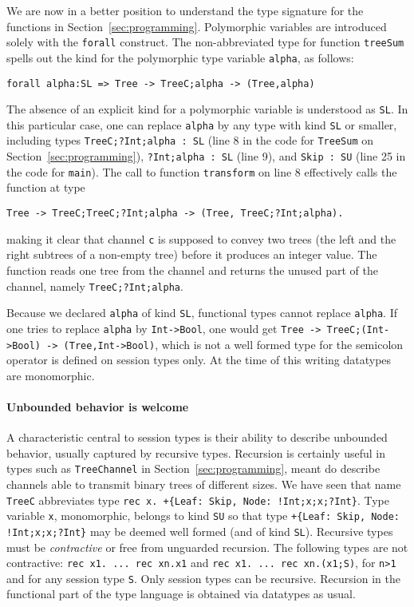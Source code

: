 We are now in a better position to understand the type signature for
the functions in Section~\ref{sec:programming}.  Polymorphic variables
are introduced solely with the \lstinline|forall| construct. The
non-abbreviated type for function \lstinline|treeSum| spells out the
kind for the polymorphic type variable \lstinline|alpha|, as follows:
%
\begin{lstlisting}
forall alpha:SL => Tree -> TreeC;alpha -> (Tree,alpha)
\end{lstlisting}
%
The absence of an explicit kind for a polymorphic variable is
understood as \lstinline|SL|. In this particular case, one can replace
\lstinline|alpha| by any type with kind \lstinline|SL| or smaller,
including types \lstinline|TreeC;?Int;alpha : SL| (line 8 in the code
for \lstinline|TreeSum| on Section~\ref{sec:programming}),
\lstinline|?Int;alpha : SL| (line 9), and \lstinline|Skip : SU| (line
25 in the code for \lstinline|main|).
%
The call to function \lstinline|transform| on line
8 effectively calls the function at type
%
\begin{lstlisting}
Tree -> TreeC;TreeC;?Int;alpha -> (Tree, TreeC;?Int;alpha).
\end{lstlisting}
%
making it clear that channel \lstinline|c| is supposed to convey two
trees (the left and the right subtrees of a non-empty tree) before it
produces an integer value. The function reads one tree from the
channel and returns the unused part of the channel, namely
\lstinline|TreeC;?Int;alpha|.

Because we declared \lstinline|alpha| of kind \lstinline|SL|,
functional types cannot replace \lstinline|alpha|.  If one tries to
replace \lstinline|alpha| by \lstinline|Int->Bool|, one would get
%
\lstinline|Tree -> TreeC;(Int->Bool) -> (Tree,Int->Bool)|, which is
not a well formed type for the semicolon operator is defined on
session types only.
%
At the time of this writing datatypes are monomorphic.

\paragraph{Unbounded behavior is welcome}

A characteristic central to session types is their ability to describe
unbounded behavior, usually captured by recursive types. Recursion is
certainly useful in types such as \lstinline|TreeChannel| in
Section~\ref{sec:programming}, meant do describe channels able to
transmit binary trees of different sizes. We have seen that name
\lstinline|TreeC| abbreviates type
%
\lstinline|rec x. +{Leaf: Skip, Node: !Int;x;x;?Int}|.  Type variable
\lstinline|x|, monomorphic, belongs to kind \lstinline|SU| so that
type
%
\lstinline|+{Leaf: Skip, Node: !Int;x;x;?Int}| may be deemed well
formed (and of kind \lstinline|SL|).
%
Recursive types must be \emph{contractive} or free from unguarded
recursion. The following types are not contractive:
%
\lstinline|rec x1. ... rec xn.x1| and
%
\lstinline|rec x1. ... rec xn.(x1;S)|, for \lstinline|n>1| and for any
session type \lstinline|S|.
%
Only session types can be recursive. Recursion in the functional part
of the type language is obtained via datatypes as usual.

